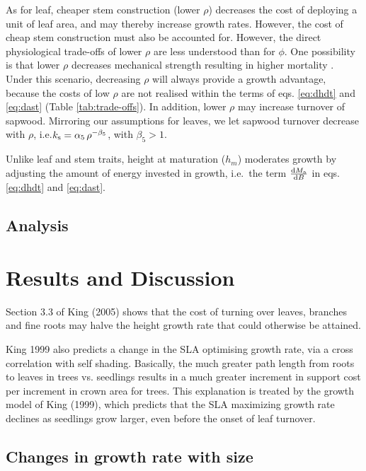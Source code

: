 \documentclass[a4paper,11pt]{article}
\begin{document}
As for leaf, cheaper stem construction (lower $\rho$) decreases the
cost of deploying a unit of leaf area, and may thereby increase growth
rates. However, the cost of cheap stem construction must also be
accounted for. However, the direct physiological trade-offs of lower
$\rho$ are less understood than for $\phi$. One possibility is that
lower $\rho$ decreases mechanical strength resulting in higher
mortality \citep{Chave-2009, Wright-2010}. Under
this scenario, decreasing $\rho$ will always provide a growth
advantage, because the costs of low $\rho$ are not realised within the
terms of eqs. \ref{eq:dhdt} and \ref{eq:dast} (Table
\ref{tab:trade-offs}). In addition, lower $\rho$ may increase turnover
of sapwood. Mirroring our assumptions for leaves, we let sapwood
turnover decrease with $\rho$,
i.e.$k_{\rm s}=\alpha_5 \, \rho^{-\beta_5}$, with $\beta_5 > 1$.

Unlike leaf and stem traits, height at maturation ($h_m$) moderates
growth by adjusting the amount of energy invested in growth, i.e.~the
term $\frac{{\rm d}M_{\rm a}}{{\rm d}B}$ in eqs.
\ref{eq:dhdt} and \ref{eq:dast}.

\subsection{Analysis}



\newpage
\section{Results and Discussion}

Section 3.3 of King (2005) shows that the cost of turning over leaves, branches and fine roots may halve the height growth rate that could otherwise be attained.

King 1999 also predicts a change in the SLA optimising growth rate, via a cross correlation with self shading. Basically, the much greater path length from roots to leaves in trees vs. seedlings results in a much greater increment in support cost per increment in crown area for trees. This explanation is treated by the growth model of King (1999), which predicts that the SLA maximizing growth rate declines as seedlings grow larger, even before the onset of leaf turnover.



\subsection{Changes in growth rate with size}
\end{document}
